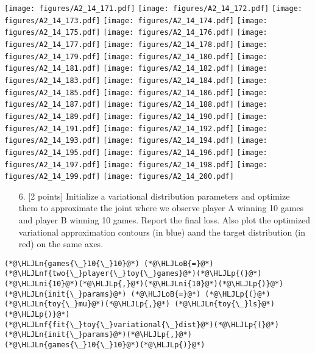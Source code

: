 \documentclass[12pt,a4paper]{article}
\newcommand{\HLJLn}[1]{#1}
\newcommand{\HLJLnf}[1]{\textcolor[RGB]{66,102,213}{#1}}
\newcommand{\HLJLni}[1]{\textcolor[RGB]{59,151,46}{#1}}
\newcommand{\HLJLoB}[1]{\textcolor[RGB]{102,102,102}{\textbf{#1}}}
\newcommand{\HLJLp}[1]{#1}
\begin{document}
\texttt{[image: figures/A2\_14\_171.pdf]}
\texttt{[image: figures/A2\_14\_172.pdf]}
\texttt{[image: figures/A2\_14\_173.pdf]}
\texttt{[image: figures/A2\_14\_174.pdf]}
\texttt{[image: figures/A2\_14\_175.pdf]}
\texttt{[image: figures/A2\_14\_176.pdf]}
\texttt{[image: figures/A2\_14\_177.pdf]}
\texttt{[image: figures/A2\_14\_178.pdf]}
\texttt{[image: figures/A2\_14\_179.pdf]}
\texttt{[image: figures/A2\_14\_180.pdf]}
\texttt{[image: figures/A2\_14\_181.pdf]}
\texttt{[image: figures/A2\_14\_182.pdf]}
\texttt{[image: figures/A2\_14\_183.pdf]}
\texttt{[image: figures/A2\_14\_184.pdf]}
\texttt{[image: figures/A2\_14\_185.pdf]}
\texttt{[image: figures/A2\_14\_186.pdf]}
\texttt{[image: figures/A2\_14\_187.pdf]}
\texttt{[image: figures/A2\_14\_188.pdf]}
\texttt{[image: figures/A2\_14\_189.pdf]}
\texttt{[image: figures/A2\_14\_190.pdf]}
\texttt{[image: figures/A2\_14\_191.pdf]}
\texttt{[image: figures/A2\_14\_192.pdf]}
\texttt{[image: figures/A2\_14\_193.pdf]}
\texttt{[image: figures/A2\_14\_194.pdf]}
\texttt{[image: figures/A2\_14\_195.pdf]}
\texttt{[image: figures/A2\_14\_196.pdf]}
\texttt{[image: figures/A2\_14\_197.pdf]}
\texttt{[image: figures/A2\_14\_198.pdf]}
\texttt{[image: figures/A2\_14\_199.pdf]}
\texttt{[image: figures/A2\_14\_200.pdf]}

\begin{itemize}
\item[6. ] [2 points] Initialize a variational distribution parameters and optimize them to approximate the joint where we observe player A winning 10 games and player B winning 10 games. Report the final loss. Also plot the optimized variational approximation contours (in blue) aand the target distribution (in red) on the same axes.

\end{itemize}

\begin{lstlisting}
(*@\HLJLn{games{\_}10{\_}10}@*) (*@\HLJLoB{=}@*) (*@\HLJLnf{two{\_}player{\_}toy{\_}games}@*)(*@\HLJLp{(}@*)(*@\HLJLni{10}@*)(*@\HLJLp{,}@*)(*@\HLJLni{10}@*)(*@\HLJLp{)}@*)
(*@\HLJLn{init{\_}params}@*) (*@\HLJLoB{=}@*) (*@\HLJLp{(}@*)(*@\HLJLn{toy{\_}mu}@*)(*@\HLJLp{,}@*) (*@\HLJLn{toy{\_}ls}@*)(*@\HLJLp{)}@*)
(*@\HLJLnf{fit{\_}toy{\_}variational{\_}dist}@*)(*@\HLJLp{(}@*)(*@\HLJLn{init{\_}params}@*)(*@\HLJLp{,}@*) (*@\HLJLn{games{\_}10{\_}10}@*)(*@\HLJLp{)}@*)
\end{lstlisting}
\end{document}
